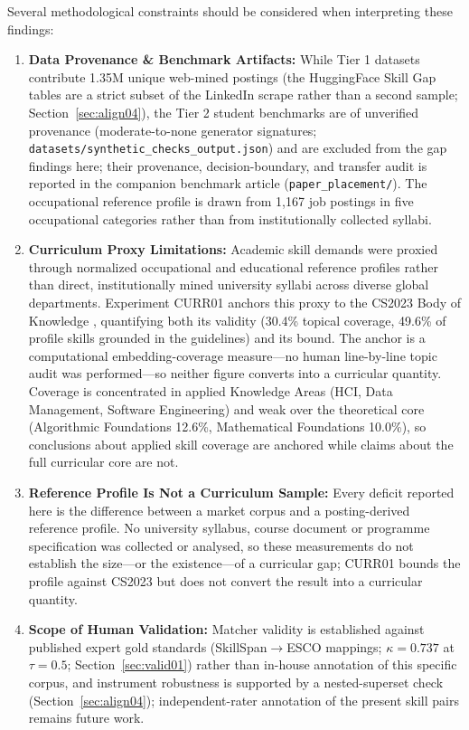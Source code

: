 \documentclass[journal]{IEEEtran}
\begin{document}
Several methodological constraints should be considered when interpreting these findings:
\begin{enumerate}
    \item \textbf{Data Provenance \& Benchmark Artifacts:} While Tier 1 datasets contribute 1.35M unique web-mined postings (the HuggingFace Skill Gap tables are a strict subset of the LinkedIn scrape rather than a second sample; Section~\ref{sec:align04}), the Tier 2 student benchmarks are of unverified provenance (moderate-to-none generator signatures; \texttt{datasets/synthetic\_checks\_output.json}) and are excluded from the gap findings here; their provenance, decision-boundary, and transfer audit is reported in the companion benchmark article (\texttt{paper\_placement/}). The occupational reference profile is drawn from 1,167 job postings in five occupational categories rather than from institutionally collected syllabi.
    \item \textbf{Curriculum Proxy Limitations:} Academic skill demands were proxied through normalized occupational and educational reference profiles rather than direct, institutionally mined university syllabi across diverse global departments. Experiment CURR01 anchors this proxy to the CS2023 Body of Knowledge \cite{taskforce2024cs2023}, quantifying both its validity (30.4\% topical coverage, 49.6\% of profile skills grounded in the guidelines) and its bound. The anchor is a computational embedding-coverage measure---no human line-by-line topic audit was performed---so neither figure converts into a curricular quantity. Coverage is concentrated in applied Knowledge Areas (HCI, Data Management, Software Engineering) and weak over the theoretical core (Algorithmic Foundations 12.6\%, Mathematical Foundations 10.0\%), so conclusions about applied skill coverage are anchored while claims about the full curricular core are not.
    \item \textbf{Reference Profile Is Not a Curriculum Sample:} Every deficit reported here is the difference between a market corpus and a posting-derived reference profile. No university syllabus, course document or programme specification was collected or analysed, so these measurements do not establish the size---or the existence---of a curricular gap; CURR01 bounds the profile against CS2023 but does not convert the result into a curricular quantity.
    \item \textbf{Scope of Human Validation:} Matcher validity is established against published expert gold standards (SkillSpan$\to$ESCO mappings; $\kappa = 0.737$ at $\tau = 0.5$; Section~\ref{sec:valid01}) rather than in-house annotation of this specific corpus, and instrument robustness is supported by a nested-superset check (Section~\ref{sec:align04}); independent-rater annotation of the present skill pairs remains future work.

\end{enumerate}
\end{document}
